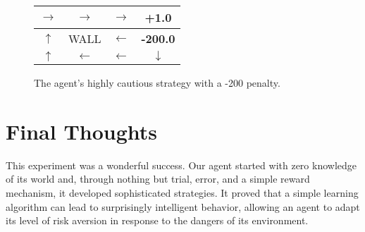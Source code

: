 \documentclass[11pt, a4paper]{article}
\begin{document}
\begin{figure}[h!]
    \centering
    \begin{tabular}{|c|c|c|c|}
        \hline
        $\rightarrow$ & $\rightarrow$ & $\rightarrow$ & \textbf{+1.0} \\
        \hline
        $\uparrow$ & WALL & $\leftarrow$ & \textbf{-200.0} \\
        \hline
        $\uparrow$ & $\leftarrow$ & $\leftarrow$ & $\downarrow$ \\
        \hline
    \end{tabular}
    \caption{The agent's highly cautious strategy with a -200 penalty.}
    \label{fig:policy2}
\end{figure}

\section{Final Thoughts}
This experiment was a wonderful success. Our agent started with zero knowledge of its world and, through nothing but trial, error, and a simple reward mechanism, it developed sophisticated strategies. It proved that a simple learning algorithm can lead to surprisingly intelligent behavior, allowing an agent to adapt its level of risk aversion in response to the dangers of its environment.
\end{document}
